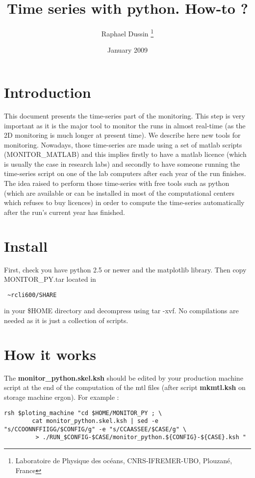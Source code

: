 \documentclass[a4paper,11pt]{article}
\begin{document}
\title{Time series with python. How-to ?}
\author{Raphael Dussin  
\thanks{ Laboratoire de Physique des oc\'{e}ans, CNRS-IFREMER-UBO, Plouzan\'e, France}}
\date{January 2009}
\maketitle

\section{Introduction}

This document presents the time-series part of the monitoring. This step is very important as it is the major tool to monitor
the runs in almost real-time (as the 2D monitoring is much longer at present time). We describe here new tools for monitoring.
Nowadays, those time-series are made using a set of matlab scripts (MONITOR\_MATLAB) and this implies firstly to have a matlab licence
(which is usually the case in research labs) and secondly to have someone running the time-series script on one of the lab computers
after each year of the run finishes. The idea raised to perform those time-series with free tools such as python (which are available or
can be installed in most of the computational centers which refuses to buy licences) in order to compute the time-series automatically
after the run's current year has finished.  

\section{Install}

First, check you have python 2.5 or newer and the matplotlib library. Then copy MONITOR\_PY.tar located in
\begin{verbatim} ~rcli600/SHARE \end{verbatim} in your \$HOME directory and decompress using tar -xvf. 
No compilations are needed as it is just a collection of scripts.


\section{How it works}

The \textbf{monitor\_python.skel.ksh} should be edited by your production machine script at the end of the computation of the mtl files
(after script \textbf{mkmtl.ksh} on storage machine ergon). 
For example :
\begin{verbatim}
rsh $ploting_machine "cd $HOME/MONITOR_PY ; \
		cat monitor_python.skel.ksh | sed -e "s/CCOONNFFIIGG/$CONFIG/g" -e "s/CCAASSEE/$CASE/g" \
		 > ./RUN_$CONFIG-$CASE/monitor_python.${CONFIG}-${CASE}.ksh "
\end{verbatim}
\end{document}
